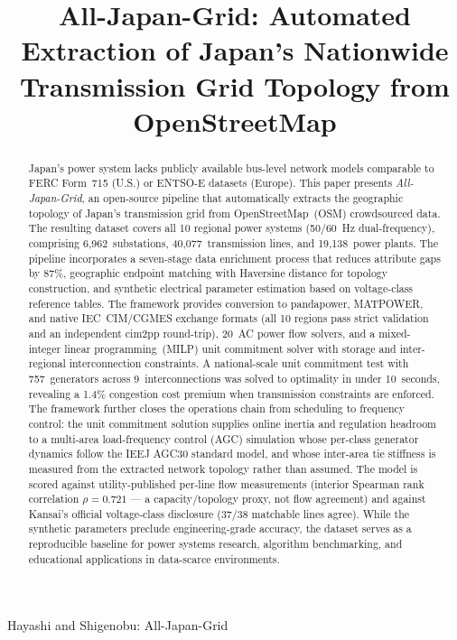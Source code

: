 \documentclass[journal]{IEEEtran}
\begin{document}
\title{All-Japan-Grid: Automated Extraction of Japan's Nationwide Transmission Grid Topology from OpenStreetMap}

\author{
}

{Hayashi and Shigenobu: All-Japan-Grid}

\maketitle

\begin{abstract}
Japan's power system lacks publicly available bus-level network models comparable to FERC Form~715 (U.S.) or ENTSO-E datasets (Europe). This paper presents \textit{All-Japan-Grid}, an open-source pipeline that automatically extracts the geographic topology of Japan's transmission grid from OpenStreetMap~(OSM) crowdsourced data. The resulting dataset covers all 10 regional power systems (50/60~Hz dual-frequency), comprising 6,962~substations, 40,077~transmission lines, and 19,138~power plants. The pipeline incorporates a seven-stage data enrichment process that reduces attribute gaps by 87\%, geographic endpoint matching with Haversine distance for topology construction, and synthetic electrical parameter estimation based on voltage-class reference tables. The framework provides conversion to pandapower, MATPOWER, and native IEC~CIM/CGMES exchange formats (all 10 regions pass strict validation and an independent cim2pp round-trip), 20~AC power flow solvers, and a mixed-integer linear programming~(MILP) unit commitment solver with storage and inter-regional interconnection constraints. A national-scale unit commitment test with 757~generators across 9~interconnections was solved to optimality in under 10~seconds, revealing a 1.4\% congestion cost premium when transmission constraints are enforced. The framework further closes the operations chain from scheduling to frequency control: the unit commitment solution supplies online inertia and regulation headroom to a multi-area load-frequency control (AGC) simulation whose per-class generator dynamics follow the IEEJ AGC30 standard model, and whose inter-area tie stiffness is measured from the extracted network topology rather than assumed. The model is scored against utility-published per-line flow measurements (interior Spearman rank correlation $\rho=0.721$ --- a capacity/topology proxy, not flow agreement) and against Kansai's official voltage-class disclosure (37/38 matchable lines agree). While the synthetic parameters preclude engineering-grade accuracy, the dataset serves as a reproducible baseline for power systems research, algorithm benchmarking, and educational applications in data-scarce environments.
\end{abstract}
\end{document}
